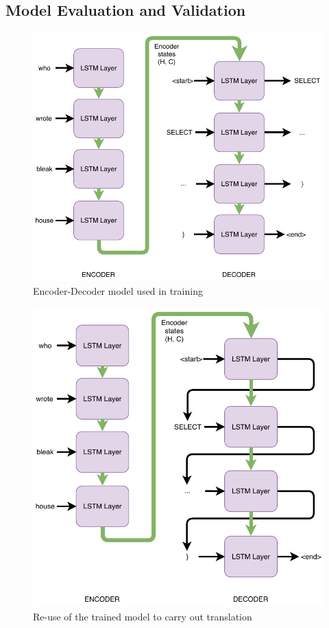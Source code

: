 \documentclass[12pt]{article}
\begin{document}
\subsection{Model Evaluation and Validation}\label{model-evaluation-and-validation}

\begin{figure}
  \centering
  \includegraphics{images/encoder-decoder-training.pdf}
  \caption{Encoder-Decoder model used in training}
  \label{fig:encoder-decoder-training}
\end{figure}

\begin{figure}
  \centering
  \includegraphics{images/encoder-decoder-translating.pdf}
  \caption{Re-use of the trained model to carry out translation}
  \label{fig:encoder-decoder-translating}
\end{figure}
\end{document}
